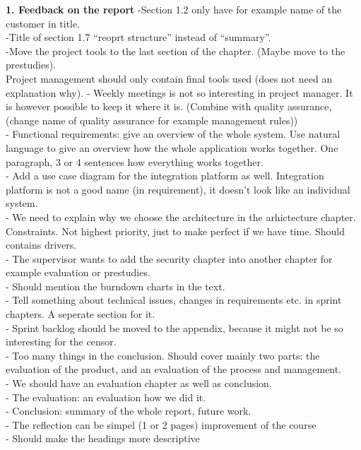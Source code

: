 \textbf{1. Feedback on the report}\newline
-Section 1.2 only have for example name of the customer in title.\\
-Title of section 1.7 “reoprt structure” instead of “summary”.\\
-Move the project tools to the last section of the chapter. (Maybe move to the prestudies).\\
Project management should only contain final tools used (does not need an explanation why).
- Weekly meetings is not so interesting in project manager. It is however possible to keep it
where it is. (Combine with quality assurance, (change name of quality assurance for example management rules))\\
- Functional requirements: give an overview of the whole system. Use natural language to give an
overview how the whole application works together. One paragraph, 3 or 4 sentences how everything works together.\\
- Add a use case diagram for the integration platform as well. Integration platform is not a good name
(in requirement), it doesn’t look like an individual system.\\
- We need to explain why we choose the architecture in the arhictecture chapter.
Constraints. Not highest priority, just to make perfect if we have time. Should contains drivers.\\
- The supervisor wants to add the security chapter into another chapter for example evaluation or prestudies.\\
- Should mention the burndown charts in the text.\\
- Tell something about technical issues, changes in requirements etc. in sprint chapters. A seperate section for it.\\
- Sprint backlog should be moved to the appendix, because it might not be so interesting for the censor.\\
- Too many things in the conclusion. Should cover mainly two parts: the evaluation of the product, and an
evaluation of the process and management.\\
- We should have an evaluation chapter as well as conclusion.\\
- The evaluation: an evaluation how we did it.\\
- Conclusion: summary of the whole report, future work.\\
- The reflection can be simpel (1 or 2 pages) improvement of the course\\
- Should make the headings more descriptive\\

